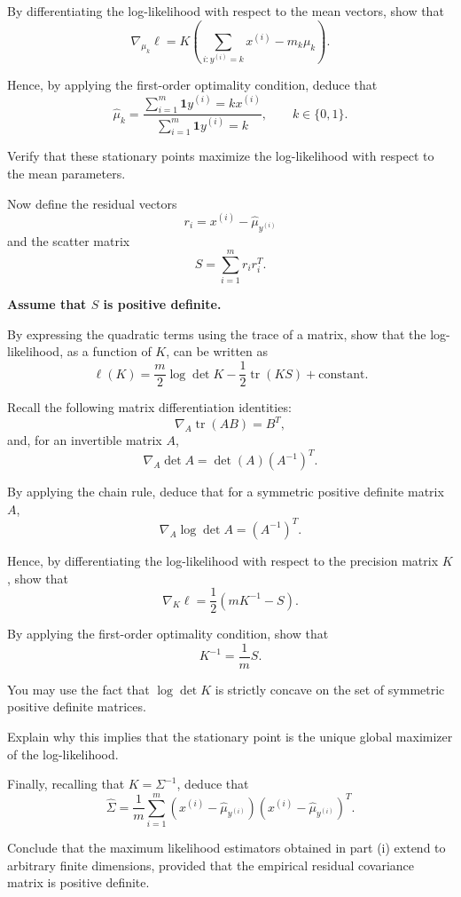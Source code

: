 \documentclass[10pt]{article}
\newcommand{\ind}{\mathbf{1}}
\begin{document}
\begin{enumerate}
\begin{enumerate}[label=(\alph*)]
By differentiating the log-likelihood with respect
to the mean vectors, show that
\[
\boxed{
\nabla_{\mu_k}\ell
=
K
\left(
\sum_{i:y^{(i)}=k}x^{(i)}
-
m_k\mu_k
\right).
}
\]

Hence, by applying the first-order optimality
condition, deduce that
\[
\boxed{
\hat{\mu}_k
=
\frac{
\sum_{i=1}^{m}
\ind{y^{(i)}=k}x^{(i)}
}{
\sum_{i=1}^{m}
\ind{y^{(i)}=k}
},
\qquad k\in\{0,1\}.
}
\]

Verify that these stationary points maximize
the log-likelihood with respect to the
mean parameters.
\vspace{3mm}

Now define the residual vectors
\[
r_i
=
x^{(i)}-\hat{\mu}_{y^{(i)}}
\]
and the scatter matrix
\[
\boxed{
S
=
\sum_{i=1}^{m}r_ir_i^T.
}
\]

\noindent\colorbox{yellow!50}{\textbf{Assume that $S$ is positive definite.}}

By expressing the quadratic terms using
the trace of a matrix, show that the
log-likelihood, as a function of $K$,
can be written as
\[
\boxed{
\ell(K)
=
\frac{m}{2}\log\det K
-
\frac{1}{2}\operatorname{tr}(KS)
+\text{constant}.
}
\]

Recall the following matrix differentiation identities:
\[
\nabla_A\operatorname{tr}(AB)
=
B^T,
\]
and, for an invertible matrix $A$,
\[
\nabla_A\det A
=
\det(A)(A^{-1})^T.
\]

By applying the chain rule, deduce that
for a symmetric positive definite matrix $A$,
\[
\boxed{
\nabla_A\log\det A
=
(A^{-1})^T.
}
\]

Hence, by differentiating the log-likelihood
with respect to the precision matrix $K$, show that
\[
\boxed{
\nabla_K\ell
=
\frac{1}{2}
\left(
mK^{-1}-S
\right).
}
\]

By applying the first-order optimality condition,
show that
\[
K^{-1}
=
\frac{1}{m}S.
\]

You may use the fact that $\log\det K$
is strictly concave on the set of symmetric
positive definite matrices.

Explain why this implies that the stationary
point is the unique global maximizer
of the log-likelihood.

Finally, recalling that $K=\Sigma^{-1}$,
deduce that
\[
\boxed{
\hat{\Sigma}
=
\frac{1}{m}
\sum_{i=1}^{m}
\left(
x^{(i)}-\hat{\mu}_{y^{(i)}}
\right)
\left(
x^{(i)}-\hat{\mu}_{y^{(i)}}
\right)^T.
}
\]

Conclude that the maximum likelihood estimators
obtained in part (i) extend to arbitrary finite
dimensions, provided that the empirical residual
covariance matrix is positive definite.


\end{enumerate}
\end{enumerate}
\end{document}
